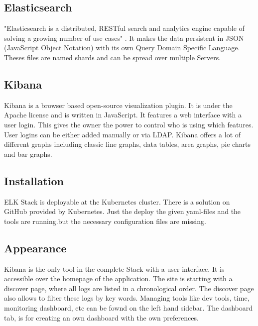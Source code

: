 \subsection{Elasticsearch}
\label{Elasticsearch}
"Elasticsearch is a distributed, RESTful search and analytics engine capable of solving a growing number of use cases" \cite{elasticsearch}. It makes the data persistent in JSON (JavaScript Object Notation) with its own Query Domain Specific Language. Theses files are named shards and can be spread over multiple Servers.
\subsection{Kibana}
Kibana is a browser based open-source visualization plugin. It is under the Apache license and is written in JavaScript. It features a web interface with a user login. This gives the owner the power to control who is using which features. User logins can be either added manually or via LDAP.
Kibana offers a lot of different graphs including classic line graphs, data tables, area graphs, pie charts and bar graphs.
\subsection{Installation}
ELK Stack is deployable at the Kubernetes cluster. There is a solution on GitHub provided by Kubernetes. Just the deploy the given yaml-files and the tools are running.but the necessary configuration files are missing.
\subsection{Appearance}%
Kibana is the only tool in the complete Stack with a user interface. It is accessible over the homepage of the application. The site is starting with a discover page, where all logs are listed in a chronological order. The discover page also allows to filter these logs by key words. Managing tools like dev tools, time, monitoring dashboard, etc can be fownd on the left hand sidebar. The dashboard tab, is for creating an own dashboard with the own preferences.
